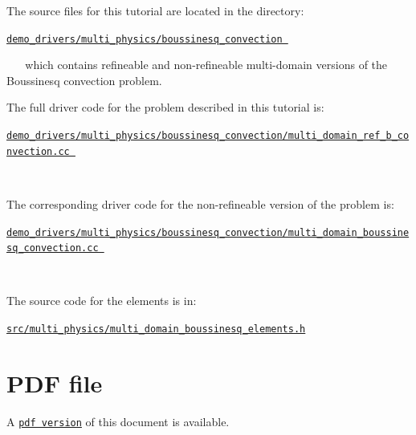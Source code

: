 \begin{DoxyItemize}
\item The source files for this tutorial are located in the directory\+:~\newline
~\newline
\begin{center} \href{../../../../demo_drivers/multi_physics/boussinesq_convection}{\tt demo\+\_\+drivers/multi\+\_\+physics/boussinesq\+\_\+convection } \end{center}  ~\newline
~\newline
 which contains refineable and non-\/refineable multi-\/domain versions of the Boussinesq convection problem. ~\newline
~\newline

\item The full driver code for the problem described in this tutorial is\+:~\newline
~\newline
\begin{center} \href{
../../../../
demo_drivers/multi_physics/boussinesq_convection/multi_domain_ref_b_convection.cc
}{\tt demo\+\_\+drivers/multi\+\_\+physics/boussinesq\+\_\+convection/multi\+\_\+domain\+\_\+ref\+\_\+b\+\_\+convection.\+cc } \end{center}  ~\newline
~\newline

\item The corresponding driver code for the non-\/refineable version of the problem is\+:~\newline
~\newline
\begin{center} \href{
../../../../
demo_drivers/multi_physics/boussinesq_convection/multi_domain_boussinesq_convection.cc
}{\tt demo\+\_\+drivers/multi\+\_\+physics/boussinesq\+\_\+convection/multi\+\_\+domain\+\_\+boussinesq\+\_\+convection.\+cc } \end{center} ~\newline

\item The source code for the elements is in\+: ~\newline
~\newline
\begin{center} \href{../../../../src/multi_physics/multi_domain_boussinesq_elements.h}{\tt src/multi\+\_\+physics/multi\+\_\+domain\+\_\+boussinesq\+\_\+elements.\+h} \end{center} 
\end{DoxyItemize}



 

 \hypertarget{index_pdf}{}\section{P\+D\+F file}\label{index_pdf}
A \href{../latex/refman.pdf}{\tt pdf version} of this document is available. 
